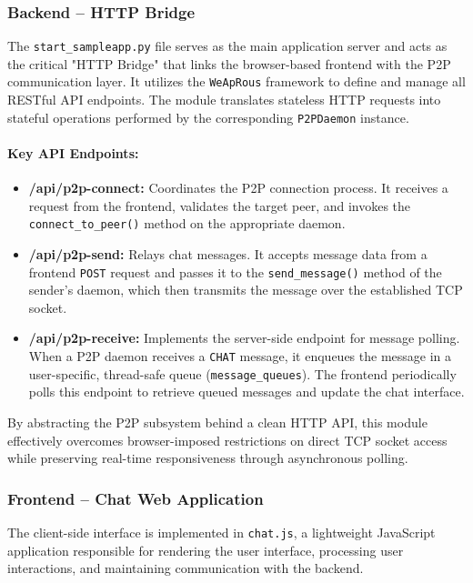 \subsubsection{Backend -- HTTP Bridge}

The \texttt{start\_sampleapp.py} file serves as the main application server and acts as the critical "HTTP Bridge" that links the browser-based frontend with the P2P communication layer. 
It utilizes the \texttt{WeApRous} framework to define and manage all RESTful API endpoints. 
The module translates stateless HTTP requests into stateful operations performed by the corresponding \texttt{P2PDaemon} instance.

\paragraph{Key API Endpoints:}
\begin{itemize}
    \item \textbf{/api/p2p-connect:} Coordinates the P2P connection process. 
    It receives a request from the frontend, validates the target peer, and invokes the \texttt{connect\_to\_peer()} method on the appropriate daemon.
    \item \textbf{/api/p2p-send:} Relays chat messages. 
    It accepts message data from a frontend \texttt{POST} request and passes it to the \texttt{send\_message()} method of the sender’s daemon, which then transmits the message over the established TCP socket.
    \item \textbf{/api/p2p-receive:} Implements the server-side endpoint for message polling. 
    When a P2P daemon receives a \texttt{CHAT} message, it enqueues the message in a user-specific, thread-safe queue (\texttt{message\_queues}). 
    The frontend periodically polls this endpoint to retrieve queued messages and update the chat interface.
\end{itemize}

By abstracting the P2P subsystem behind a clean HTTP API, this module effectively overcomes browser-imposed restrictions on direct TCP socket access while preserving real-time responsiveness through asynchronous polling.

\subsubsection{Frontend -- Chat Web Application}

The client-side interface is implemented in \texttt{chat.js}, a lightweight JavaScript application responsible for rendering the user interface, processing user interactions, and maintaining communication with the backend.

